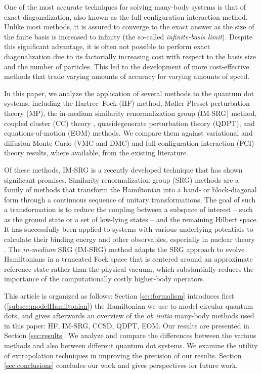 One of the most accurate techniques for solving many-body systems is that of exact diagonalization, also known as the full configuration interaction method.  Unlike most methods, it is assured to converge to the exact answer as the size of the finite basis is increased to infinity (the so-called \textit{infinite-basis limit}).  Despite this significant advantage, it is often not possible to perform exact diagonalization due to its factorially increasing cost with respect to the basis size and the number of particles.  This led to the development of more cost-effective methods that trade varying amounts of accuracy for varying amounts of speed.

In this paper, we analyze the application of several methods to the quantum dot systems, including the Hartree--Fock (HF) method, M\o ller-Plesset perturbation theory (MP), the in-medium similarity renormalization group (IM-SRG) method, coupled cluster (CC) theory \cite{PhysRevB.67.045320,heidari:114708,PhysRevB.84.115302}, quasidegenerate perturbation theory (QDPT), and equations-of-motion (EOM) methods.  We compare them against variational and diffusion Monte Carlo (VMC and DMC) \cite{PhysRevB.68.035304,PhysRevB.62.8120,PhysRevB.84.115302,PhysRevB.54.4780} and full configuration interaction (FCI) theory \cite{olsen2013thesis,JJAP.36.3924,PhysRevB.56.6428,2008arXiv0810.2644K,rontani:124102} results, where available, from the existing literature.

Of these methods, IM-SRG is a recently developed technique that has shown significant promises.  Similarity renormalization group (SRG) methods are a family of methods that transform the Hamiltonian into a band- or block-diagonal form through a continuous sequence of unitary transformations.  The goal of such a transformation is to reduce the coupling between a subspace of interest -- such as the ground state or a set of low-lying states -- and the remaining Hilbert space.  It has successfully been applied to systems with various underlying potentials to calculate their binding energy and other observables, especially in nuclear theory \cite{ScottSRG,PhysRevC.75.061001,SRGThreeDim}.  The \emph{in-medium} SRG (IM-SRG) method adapts the SRG approach to evolve Hamiltonians in a truncated Fock space that is centered around an approximate reference state rather than the physical vacuum, which substantially reduces the importance of the computationally costly higher-body operators.

This article is organized as follows: Section \ref{sec:formalism} introduces first (\ref{subsec:modelHamiltonian}) the Hamiltonian we use to model circular quantum dots, and gives afterwards an overview of the \textit{ab initio} many-body methods used in this paper: HF, IM-SRG, CCSD, QDPT, EOM.  Our results are presented in Section \ref{sec:results}.  We analyze and compare the differences between the various methods and also between different quantum dot systems.  We examine the utility of extrapolation techniques in improving the precision of our results.  Section \ref{sec:conclusions} concludes our work and gives perspectives for future work.


